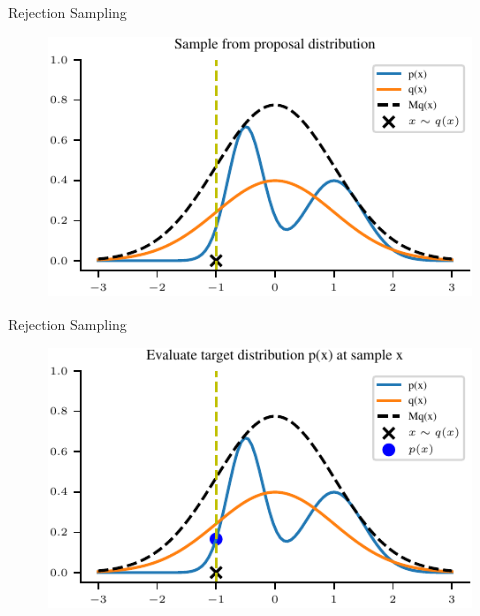 \documentclass[handout]{beamer}
\begin{document}
    \begin{frame}{Rejection Sampling}
        \begin{figure}
            \centering
            \includegraphics{notebooks/figures/sampling/rejection-sampling--1.0-True-True-True-True-False-False-False-False.pdf}
        \end{figure}
    \end{frame}

    \begin{frame}{Rejection Sampling}
        \begin{figure}
            \centering
            \includegraphics{notebooks/figures/sampling/rejection-sampling--1.0-True-True-True-True-True-False-False-False.pdf}
        \end{figure}
    \end{frame}
\end{document}
